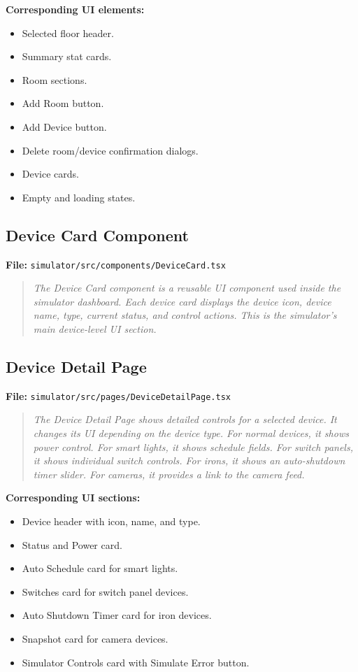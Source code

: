 \documentclass[11pt,a4paper]{article}
\begin{document}
\textbf{Corresponding UI elements:}
\begin{itemize}
    \item Selected floor header.
    \item Summary stat cards.
    \item Room sections.
    \item Add Room button.
    \item Add Device button.
    \item Delete room/device confirmation dialogs.
    \item Device cards.
    \item Empty and loading states.
\end{itemize}

\subsection{Device Card Component}
\textbf{File:} \texttt{simulator/src/components/DeviceCard.tsx}

\begin{quote}
\textit{The Device Card component is a reusable UI component used inside the simulator dashboard. Each device card displays the device icon, device name, type, current status, and control actions. This is the simulator's main device-level UI section.}
\end{quote}

\subsection{Device Detail Page}
\textbf{File:} \texttt{simulator/src/pages/DeviceDetailPage.tsx}

\begin{quote}
\textit{The Device Detail Page shows detailed controls for a selected device. It changes its UI depending on the device type. For normal devices, it shows power control. For smart lights, it shows schedule fields. For switch panels, it shows individual switch controls. For irons, it shows an auto-shutdown timer slider. For cameras, it provides a link to the camera feed.}
\end{quote}

\textbf{Corresponding UI sections:}
\begin{itemize}
    \item Device header with icon, name, and type.
    \item Status and Power card.
    \item Auto Schedule card for smart lights.
    \item Switches card for switch panel devices.
    \item Auto Shutdown Timer card for iron devices.
    \item Snapshot card for camera devices.
    \item Simulator Controls card with Simulate Error button.
\end{itemize}
\end{document}
